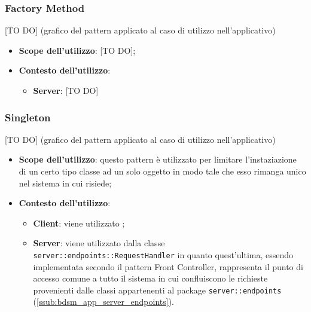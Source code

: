 	\subsubsection{Factory Method} %
	\label{ssub:factory_method}
	[TO DO] (grafico del pattern applicato al caso di utilizzo nell'applicativo)
		\begin{itemize}
			\item \textbf{Scope dell'utilizzo}: [TO DO];
			\item \textbf{Contesto dell'utilizzo}:
				\begin{itemize}
					\item \textbf{Server}: [TO DO]
				\end{itemize}
		\end{itemize}


	\subsubsection{Singleton} %
	\label{ssub:singleton}
	[TO DO] (grafico del pattern applicato al caso di utilizzo nell'applicativo)
		\begin{itemize}
			\item \textbf{Scope dell'utilizzo}: questo pattern è utilizzato per limitare l'instaziazione di un certo tipo classe ad un solo oggetto in modo tale che esso rimanga unico nel sistema in cui risiede;
			\item \textbf{Contesto dell'utilizzo}:
				\begin{itemize}
					\item \textbf{Client}: viene utilizzato ;
					\item \textbf{Server}: viene utilizzato dalla classe \texttt{server::endpoints::RequestHandler} in quanto quest'ultima, essendo implementata secondo il pattern Front Controller, rappresenta il punto di accesso comune a tutto il sistema in cui confluiscono le richieste provenienti dalle classi appartenenti al package \texttt{server::endpoints} (\ref{ssub:bdsm_app_server_endpoints}).
				\end{itemize}
		\end{itemize}
